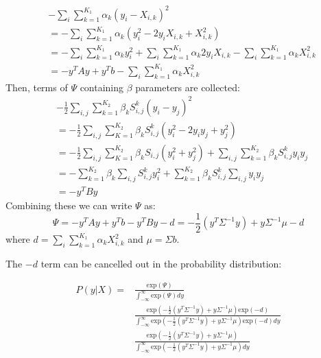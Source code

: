 \begin{equation}
\begin{split}
& -\sum_i \sum \limits_{k=1}^{K_1} \alpha_k(y_i-X_{i,k})^2 \\
& = -\sum_i \sum \limits_{k=1}^{K_1} \alpha_k(y_i^2-2y_iX_{i,k}+X_{i,k}^2) \\
& = -\sum_i \sum \limits_{k=1}^{K_1} \alpha_k y_i^2 + \sum_i \sum\limits_{k=1}^{K_1} \alpha_k 2y_i X_{i,k} - \sum_i \sum\limits_{k=1}^{K_1} \alpha_k X_{i,k}^2\\
& = -y^TAy + y^Tb - \sum_i \sum\limits_{k=1}^{K_1} \alpha_k X_{i,k}^2
\end{split}
\end{equation}
Then, terms of $\Psi$ containing $\beta$ parameters are collected:
\begin{equation}
\begin{split}
& -\frac{1}{2}\sum_{i,j}\sum\limits_{k=1}^{K_2}\beta_k S_{i,j}^k(y_i-y_j)^2\\
& = -\frac{1}{2}\sum_{i,j}\sum\limits_{K=1}^{K_2}\beta_k S_{i,j}^k(y_i^2-2y_iy_j+y_j^2)\\
& = -\frac{1}{2}\sum_{i,j}\sum\limits_{K=1}^{K_2}\beta_k S_{i,j}(y_i^2+y_j^2) + \sum_{i,j} \sum\limits_{k=1}^{K_2}\beta_k S_{i,j}^ky_iy_j\\
& =  -\sum\limits_{k=1}^{K_2}\beta_k\sum_{i,j}S_{i,j}^ky_i^2 + \sum\limits_{k=1}^{K_2}\beta_kS_{i,j}^k\sum_{i,j}y_iy_j\\
& = -y^TBy
\end{split}
\end{equation}
Combining these we can write $\Psi$ as:
\begin{equation}
\Psi=-y^TAy + y^Tb - y^TBy - d = - \frac{1}{2}(y^T\Sigma^{-1}y)+y\Sigma^{-1}\mu - d
\end{equation}
where $d=\sum_i\sum\limits_{k=1}^{K_1}\alpha_kX_{i,k}^2$ and $\mu = \Sigma b$.

The $-d$ term can be cancelled out in the probability distribution:

\begin{equation}
\begin{split}
P(y|X)=& \frac{\text{exp}(\Psi)}{\int_{-\infty}^{\infty}\text{exp}(\Psi) dy}\\
& \frac{\text{exp}(- \frac{1}{2}(y^T\Sigma^{-1}y)+y\Sigma^{-1}\mu)\text{exp}(-d)}{\int_{-\infty}^{\infty}\text{exp}(- \frac{1}{2}(y^T\Sigma^{-1}y)+y\Sigma^{-1}\mu)\text{exp}(-d) dy} \\
& \frac{\text{exp}(- \frac{1}{2}(y^T\Sigma^{-1}y)+y\Sigma^{-1}\mu)}{\int_{-\infty}^{\infty}\text{exp}(- \frac{1}{2}(y^T\Sigma^{-1}y)+y\Sigma^{-1}\mu) dy} 
\end{split}
\end{equation}

